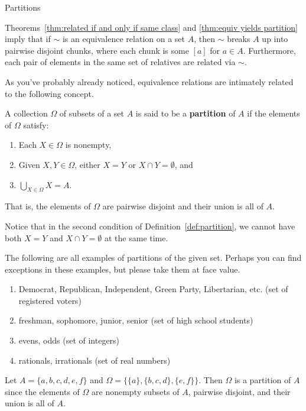 \begin{section}{Partitions}

Theorems~\ref{thm:related if and only if same class} and \ref{thm:equiv yields partition} imply that if $\sim$ is an equivalence relation on a set $A$, then $\sim$ breaks $A$ up into pairwise disjoint chunks, where each chunk is some $[a]$ for $a\in A$. Furthermore, each  pair of elements in the same set of relatives are related via $\sim$.

As you've probably already noticed, equivalence relations are intimately related to the following concept.

\begin{definition}\label{def:partition}
A collection $\Omega$ of subsets of a set $A$ is said to be a \textbf{partition} of $A$ if the elements of $\Omega$ satisfy:
\begin{enumerate}[label=\textrm{(\alph*)}]
\item Each $X\in \Omega$ is nonempty,
\item Given $X,Y\in\Omega$, either $X=Y$ or $X\cap Y=\emptyset$, and
\item $\displaystyle \bigcup_{X\in\Omega}X=A$.
\end{enumerate}
That is, the elements of $\Omega$ are pairwise disjoint and their union is all of $A$.
\end{definition}

Notice that in the second condition of Definition~\ref{def:partition}, we cannot have both $X=Y$ and $X\cap Y=\emptyset$ at the same time.

\begin{example}
The following are all examples of partitions of the given set.  Perhaps you can find exceptions in these examples, but please take them at face value.
\begin{enumerate}[label=\textrm{(\alph*)}]
\item Democrat, Republican, Independent, Green Party, Libertarian, etc. (set of registered voters)
\item freshman, sophomore, junior, senior (set of high school students)
\item evens, odds (set of integers)
\item rationals, irrationals (set of real numbers)
\end{enumerate}
\end{example}

\begin{example}\label{ex:a partition}
Let $A=\{a,b,c,d,e,f\}$ and $\Omega=\{\{a\}, \{b,c,d\}, \{e,f\}\}$.  Then $\Omega$ is a partition of $A$ since the elements of $\Omega$ are nonempty subsets of $A$, pairwise disjoint, and their union is all of $A$.
\end{example}


\end{section}
